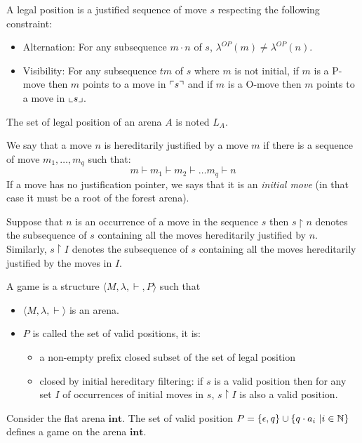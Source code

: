 \begin{dfn}
A legal position is a justified sequence of move $s$ respecting the following constraint:
\begin{itemize}
\item Alternation: For any subsequence $m \cdot n$ of $s$, $\lambda^{OP}(m) \neq \lambda^{OP}(n)$.
\item Visibility: For any subsequence $t m$ of $s$ where $m$ is not initial, if $m$ is a P-move then $m$ points to a move in $\ulcorner s \urcorner$
and if $m$ is a O-move then $m$ points to a move in $\llcorner s \lrcorner$.
\end{itemize}

The set of legal position of an arena $A$ is noted $L_A$.
\end{dfn}

We say that a move $n$ is hereditarily justified by a move $m$ if there is a sequence of move
$m_1, \ldots, m_q$ such that:
$$ m \vdash m_1 \vdash m_2 \vdash \ldots m_q \vdash n$$
If a move has no justification pointer, we says that it is an
\emph{initial move} (in that case it must be a root of the forest
arena).

Suppose that $n$ is an occurrence of a move in the sequence $s$ then
$s \upharpoonright n$ denotes the subsequence of $s$ containing all the moves hereditarily justified by $n$.
Similarly, $s \upharpoonright I$ denotes the
subsequence of $s$ containing all the moves hereditarily justified by the moves in $I$.

\begin{dfn}[Game]
A game is a structure $\langle M, \lambda, \vdash, P \rangle$ such that
\begin{itemize}
\item $ \langle M, \lambda, \vdash \rangle$ is an arena.
\item $P$ is called the set of valid positions, it is:
    \begin{itemize}
    \item a non-empty prefix closed subset of the set of legal position
    \item closed by initial hereditary filtering: if $s$ is a valid position then for any set $I$ of occurrences of initial moves
    in $s$, $s\upharpoonright I$ is also a valid position.
    \end{itemize}
\end{itemize}
\end{dfn}

\begin{exmp}  Consider the flat arena  $\mathbf{int}$.
The set of valid position $P = \{ \epsilon, q \} \cup \{ q \cdot
a_i \ | i \in \mathbb{N} \}$ defines a game on the arena $\mathbf{int}$.
\end{exmp}


